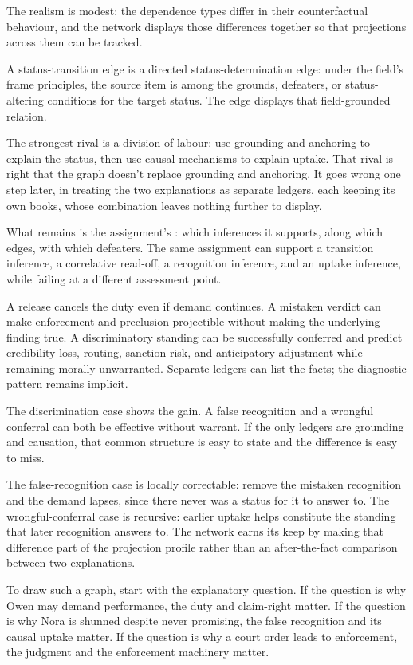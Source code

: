 \documentclass[12pt]{article}
\begin{document}
The realism is modest: the dependence types differ in their counterfactual behaviour, and the network displays those differences together so that projections across them can be tracked.

A status-transition edge is a directed status-determination edge: under the field's frame principles, the source item is among the grounds, defeaters, or status-altering conditions for the target status. The edge displays that field-grounded relation.

The strongest rival is a division of labour: use grounding and anchoring to explain the status, then use causal mechanisms to explain uptake. That rival is right that the graph doesn't replace grounding and anchoring. It goes wrong one step later, in treating the two explanations as separate ledgers, each keeping its own books, whose combination leaves nothing further to display.

What remains is the assignment's : which inferences it supports, along which edges, with which defeaters. The same assignment can support a transition inference, a correlative read-off, a recognition inference, and an uptake inference, while failing at a different assessment point.

A release cancels the duty even if demand continues. A mistaken verdict can make enforcement and preclusion projectible without making the underlying finding true. A discriminatory standing can be successfully conferred and predict credibility loss, routing, sanction risk, and anticipatory adjustment while remaining morally unwarranted. Separate ledgers can list the facts; the diagnostic pattern remains implicit.

The discrimination case shows the gain. A false recognition and a wrongful conferral can both be effective without warrant. If the only ledgers are grounding and causation, that common structure is easy to state and the difference is easy to miss.

The false-recognition case is locally correctable: remove the mistaken recognition and the demand lapses, since there never was a status for it to answer to. The wrongful-conferral case is recursive: earlier uptake helps constitute the standing that later recognition answers to. The network earns its keep by making that difference part of the projection profile rather than an after-the-fact comparison between two explanations.

To draw such a graph, start with the explanatory question. If the question is why Owen may demand performance, the duty and claim-right matter. If the question is why Nora is shunned despite never promising, the false recognition and its causal uptake matter. If the question is why a court order leads to enforcement, the judgment and the enforcement machinery matter.
\end{document}
